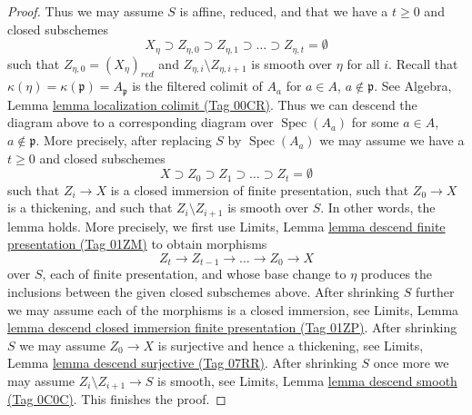 \documentclass{amsart}
\theoremstyle{plain}
\theoremstyle{definition}
\theoremstyle{remark}
\numberwithin{equation}{subsection}
\def\Spec{\mathop{\mathrm{Spec}}}
\begin{document}
\begin{proof}
\medskip\noindent
Thus we may assume $S$ is affine, reduced, and that we have a $t \geq 0$
and closed subschemes
$$
X_\eta \supset Z_{\eta, 0} \supset Z_{\eta, 1}
\supset \ldots \supset Z_{\eta, t} = \emptyset
$$
such that $Z_{\eta, 0} = (X_\eta)_{red}$ and
$Z_{\eta, i} \setminus Z_{\eta, i + 1}$
is smooth over $\eta$ for all $i$.
Recall that $\kappa(\eta) = \kappa(\mathfrak p) = A_\mathfrak p$ is
the filtered colimit of $A_a$ for $a \in A$, $a \not \in \mathfrak p$.
See Algebra, Lemma \href{https://stacks.math.columbia.edu/tag/00CR}{lemma localization colimit (Tag 00CR)}.
Thus we can descend the diagram above to a corresponding diagram
over $\Spec(A_a)$ for some $a \in A$, $a \not \in \mathfrak p$.
More precisely, after replacing $S$ by $\Spec(A_a)$
we may assume we have a $t \geq 0$ and closed subschemes
$$
X \supset Z_0 \supset Z_1 \supset \ldots \supset Z_t = \emptyset
$$
such that $Z_i \to X$ is a closed immersion of finite presentation,
such that $Z_0 \to X$ is a thickening, and such that $Z_i \setminus Z_{i + 1}$
is smooth over $S$. In other words, the lemma holds.
More precisely, we first use
Limits, Lemma \href{https://stacks.math.columbia.edu/tag/01ZM}{lemma descend finite presentation (Tag 01ZM)}
to obtain morphisms
$$
Z_t \to Z_{t - 1} \to \ldots \to Z_0 \to X
$$
over $S$, each of finite presentation, and whose
base change to $\eta$ produces the inclusions between the given
closed subschemes above. After shrinking $S$ further we may assume
each of the morphisms is a closed immersion, see
Limits, Lemma
\href{https://stacks.math.columbia.edu/tag/01ZP}{lemma descend closed immersion finite presentation (Tag 01ZP)}.
After shrinking $S$ we may assume $Z_0 \to X$ is surjective
and hence a thickening, see
Limits, Lemma \href{https://stacks.math.columbia.edu/tag/07RR}{lemma descend surjective (Tag 07RR)}.
After shrinking $S$ once more we may assume
$Z_i \setminus Z_{i + 1} \to S$ is smooth, see
Limits, Lemma \href{https://stacks.math.columbia.edu/tag/0C0C}{lemma descend smooth (Tag 0C0C)}.
This finishes the proof.
\end{proof}
\end{document}

